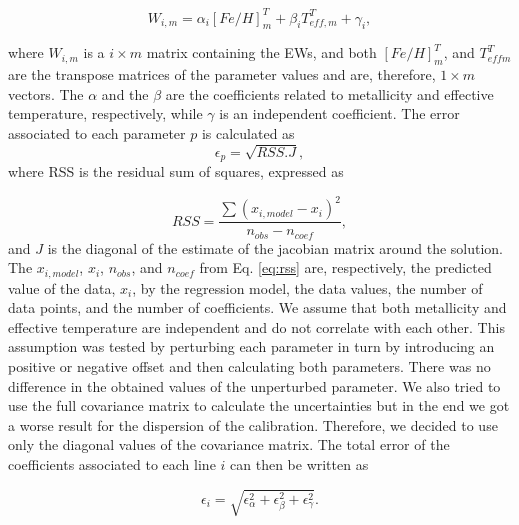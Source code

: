 \documentclass{aa}
\begin{document}
\begin{equation}
W_{i,m} = \alpha_{i}[Fe/H]_{m}^{T} + \beta_{i}T_{eff,m}^{T} + \gamma_{i}, %
\label{eq:fit}
\end{equation}

where $W_{i,m}$ is a $i\times m$ matrix containing the EWs, and both $[Fe/H]_{m}^{T}$, and $T_{eff m}^{T}$ are the transpose matrices of the parameter values and are, therefore, $1\times m$ vectors. The $\alpha$ and the $\beta$ are the coefficients related to metallicity and effective temperature, respectively, while $\gamma$ is an independent coefficient. The error associated to each parameter $p$ is calculated as 
\begin{equation}
\label{eq:rss}
\epsilon_{p} = \sqrt{RSS.J},
\end{equation}
where RSS is the residual sum of squares, expressed as

\begin{equation}
RSS = \frac{\sum{(x_{i,model}-x_{i})^{2}}}{n_{obs}-n_{coef}},
\end{equation}
and $J$ is the diagonal of the estimate of the jacobian matrix around the solution. %
The $x_{i,model}$, $x_{i}$, $n_{obs}$, and $n_{coef}$ from Eq. \ref{eq:rss} are, respectively, the predicted value of the data, $x_{i}$, by the regression model, the data values, the number of data points, and the number of coefficients. We assume that both metallicity and effective temperature are independent and do not correlate with each other. This assumption was tested by perturbing each parameter in turn by introducing an positive or negative offset and then calculating both parameters. There was no difference in the obtained values of the unperturbed parameter. We also tried to use the full covariance matrix to calculate the uncertainties but in the end we got a worse result for the dispersion of the calibration. Therefore, we decided to use only the diagonal values of the covariance matrix. The total error of the coefficients associated to each line $i$ can then be written as

\begin{equation} 
\epsilon_{i} = \sqrt{\epsilon_{\alpha}^{2}+\epsilon_{\beta}^{2}+\epsilon_{\gamma}^{2}}.
\end{equation}
\end{document}
